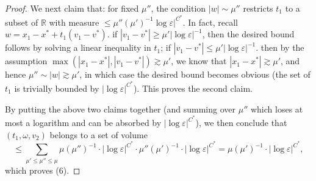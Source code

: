\documentclass[10pt, reqno]{amsart}
\newcommand{\Rb}{\mathbb R}
\theoremstyle{definition}
\theoremstyle{remark}
\numberwithin{equation}{section}
\begin{document}
\begin{proof}
 We next claim that: for fixed $\mu''$, the condition $|w|\sim\mu''$ restricts $t_1$ to a subset of $\Rb$ with measure $\leq \mu''(\mu')^{-1}\log\varepsilon|^{C^*}$. In fact, recall $w=x_1-x^*+t_1(v_1-v^*)$. if $|v_1-v^*|\geq \mu'|\log\varepsilon|^{-1}$, then the desired bound follows by solving a linear inequality in $t_1$; if $|v_1-v^*|\leq \mu'|\log\varepsilon|^{-1}$. then by the assumption $\max(|x_1-x^*|,|v_1-v^*|)\gtrsim \mu'$, we know that $|x_1-x^*|\gtrsim\mu'$, and hence $\mu''\sim|w|\gtrsim\mu'$, in which case the desired bound becomes obvious (the set of $t_1$ is trivially bounded by $|\log\varepsilon|^{C^*}$). This proves the second claim.

 By putting the above two claims together (and summing over $\mu''$ which loses at most a logarithm and can be absorbed by $|\log\varepsilon|^{C^*}$), we then conclude that $(t_1,\omega,v_2)$ belongs to a set of volume
 \[\leq \sum_{\mu'\leq\mu''\leq\mu}\mu(\mu'')^{-1}\cdot|\log\varepsilon|^{C^*}\cdot \mu''(\mu')^{-1}\cdot|\log\varepsilon|^{C^*}=\mu(\mu')^{-1}\cdot|\log\varepsilon|^{C^*},\] which proves (6). 
\end{proof}
\end{document}
